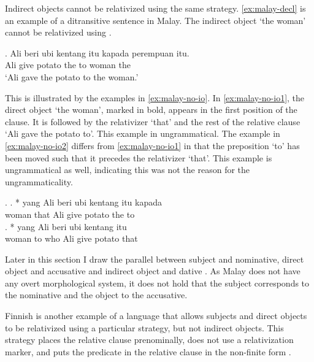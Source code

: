 Indirect objects cannot be relativized using the same strategy. \ref{ex:malay-decl} is an example of a ditransitive sentence in Malay. The indirect object  `the woman' cannot be relativized using .

\exg. Ali beri {ubi kentang} itu kapada perempuan itu.\\
 Ali give potato the to woman the\\
 `Ali gave the potato to the woman.'\label{ex:malay-decl} 

This is illustrated by the examples in \ref{ex:malay-no-io}. In \ref{ex:malay-no-io1}, the direct object  `the woman', marked in bold, appears in the first position of the clause. It is followed by the relativizer  `that' and the rest of the relative clause  `Ali gave the potato to'. This example in ungrammatical.
The example in \ref{ex:malay-no-io2} differs from \ref{ex:malay-no-io1} in that the preposition  `to' has been moved such that it precedes the relativizer  `that'. This example is ungrammatical as well, indicating this was not the reason for the ungrammaticality.

\ex.\label{ex:malay-no-io}
\ag. * yang Ali beri {ubi kentang} itu kapada\\
 woman that Ali give potato the to\\\label{ex:malay-no-io1}
\bg. *  yang Ali beri {ubi kentang} itu\\
 woman to who Ali give potato that\\\label{ex:malay-no-io2}

Later in this section I draw the parallel between subject and nominative, direct object and accusative and indirect object and dative \citep[after][]{caha2009}. As Malay does not have any overt morphological system, it does not hold that the subject corresponds to the nominative and the object to the accusative.

Finnish is another example of a language that allows subjects and direct objects to be relativized using a particular strategy, but not indirect objects. This strategy places the relative clause prenominally, does not use a relativization marker, and puts the predicate in the relative clause in the non-finite form \citep{keenan1977}.

